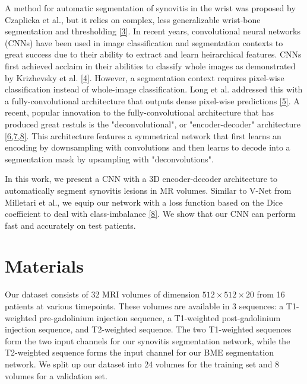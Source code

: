\documentclass[11pt]{article}
\begin{document}
A method for automatic segmentation of synovitis in the wrist was proposed by Czaplicka et al., but it relies on complex, less generalizable wrist-bone segmentation and thresholding \hyperref[cza]{[3]}. In recent years, convolutional neural networks (CNNs) have been used in image classification and segmentation contexts to great success due to their ability to extract and learn heirarchical features. CNNs first achieved acclaim in their abilities to classify whole images as demonstrated by Krizhevsky et al. \hyperref[kriz]{[4]}. However, a segmentation context requires pixel-wise classification instead of whole-image classification. Long et al. addressed this with a fully-convolutional architecture that outputs dense pixel-wise predictions \hyperref[long]{[5]}. A recent, popular innovation to the fully-convolutional architecture that has produced great restuls is the "deconvolutional", or "encoder-decoder" architecture \hyperref[noh]{[6,7,8]}. This architecture features a symmetrical network that first learns an encoding by downsampling with convolutions and then learns to decode into a segmentation mask by upsampling with "deconvolutions". 

In this work, we present a CNN with a 3D encoder-decoder architecture to automatically segment synovitis lesions in MR volumes. Similar to V-Net from Milletari et al., we equip our network with a loss function based on the Dice coefficient to deal with class-imbalance \hyperref[vnet]{[8]}. We show that our CNN can perform fast and accurately on test patients. 

\section{Materials}

Our dataset consists of 32 MRI volumes of dimension $512 \times 512 \times 20$ from 16 patients at various timepoints. These volumes are available in 3 sequences: a T1-weighted pre-gadolinium injection sequence, a T1-weighted post-gadolinium injection sequence, and T2-weighted sequence. The two T1-weighted sequences form the two input channels for our synovitis segmentation network, while the T2-weighted sequence forms the input channel for our BME segmentation network. We split up our dataset into 24 volumes for the training set and 8 volumes for a validation set. 
\end{document}
